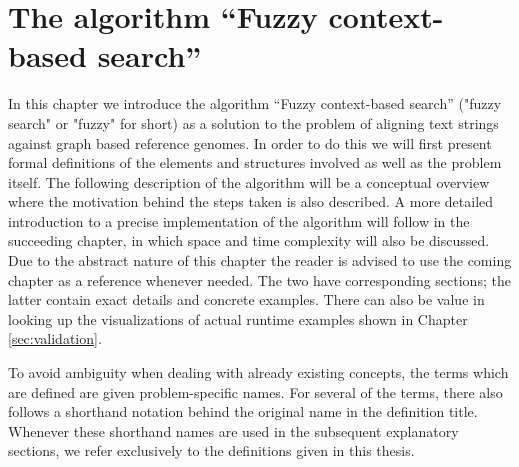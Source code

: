 \documentclass[thesis.tex]{subfiles}
\begin{document}
\chapter{The algorithm ``Fuzzy context-based search''}
{\parindent0pt
In this chapter we introduce the algorithm ``Fuzzy context-based search'' ("fuzzy search" or "fuzzy" for short) as a solution to the problem of aligning text strings against graph based reference genomes. In order to do this we will first present formal definitions of the elements and structures involved as well as the problem itself. The following description of the algorithm will be a conceptual overview where the motivation behind the steps taken is also described. A more detailed introduction to a precise implementation of the algorithm will follow in the succeeding chapter, in which space and time complexity will also be discussed. Due to the abstract nature of this chapter the reader is advised to use the coming chapter as a reference whenever needed. The two have corresponding sections; the latter contain exact details and concrete examples. There can also be value in looking up the visualizations of actual runtime examples shown in Chapter \ref{sec:validation}.\\
\par\noindent
To avoid ambiguity when dealing with already existing concepts, the terms which are defined are given problem-specific names. For several of the terms, there also follows a shorthand notation behind the original name in the definition title. Whenever these shorthand names are used in the subsequent explanatory sections, we refer exclusively to the definitions given in this thesis.
}
\end{document}
